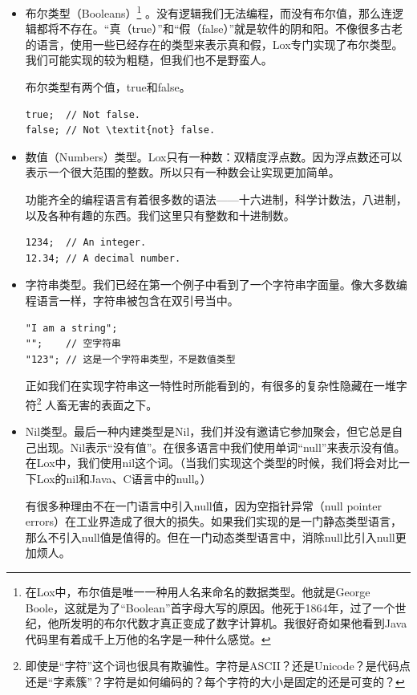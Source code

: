 \documentclass[cn,10pt,math=newtx,citestyle=gb7714-2015,bibstyle=gb7714-2015]{elegantbook}
\begin{document}
\begin{itemize}
\item 布尔类型（Booleans）\footnote{在Lox中，布尔值是唯一一种用人名来命名的数据类型。他就是George Boole，这就是为了“Boolean”首字母大写的原因。他死于1864年，过了一个世纪，他所发明的布尔代数才真正变成了数字计算机。我很好奇如果他看到Java代码里有着成千上万他的名字是一种什么感觉。} 。没有逻辑我们无法编程，而没有布尔值，那么连逻辑都将不存在。“真（true）”和“假（false）”就是软件的阴和阳。不像很多古老的语言，使用一些已经存在的类型来表示真和假，Lox专门实现了布尔类型。我们可能实现的较为粗糙，但我们也不是野蛮人。

布尔类型有两个值，true和false。

\begin{verbatim}
true;  // Not false.
false; // Not \textit{not} false.
\end{verbatim}

\item 数值（Numbers）类型。Lox只有一种数：双精度浮点数。因为浮点数还可以表示一个很大范围的整数。所以只有一种数会让实现更加简单。

功能齐全的编程语言有着很多数的语法——十六进制，科学计数法，八进制，以及各种有趣的东西。我们这里只有整数和十进制数。

\begin{verbatim}
1234;  // An integer.
12.34; // A decimal number.
\end{verbatim}

\item 字符串类型。我们已经在第一个例子中看到了一个字符串字面量。像大多数编程语言一样，字符串被包含在双引号当中。

\begin{verbatim}
"I am a string";
"";    // 空字符串
"123"; // 这是一个字符串类型，不是数值类型
\end{verbatim}

正如我们在实现字符串这一特性时所能看到的，有很多的复杂性隐藏在一堆字符\footnote{即使是“字符”这个词也很具有欺骗性。字符是ASCII？还是Unicode？是代码点还是“字素簇”？字符是如何编码的？每个字符的大小是固定的还是可变的？} 人畜无害的表面之下。

\item Nil类型。最后一种内建类型是Nil，我们并没有邀请它参加聚会，但它总是自己出现。Nil表示“没有值”。在很多语言中我们使用单词“null”来表示没有值。在Lox中，我们使用nil这个词。（当我们实现这个类型的时候，我们将会对比一下Lox的nil和Java、C语言中的null。）

有很多种理由不在一门语言中引入null值，因为空指针异常（null pointer errors）在工业界造成了很大的损失。如果我们实现的是一门静态类型语言，那么不引入null值是值得的。但在一门动态类型语言中，消除null比引入null更加烦人。
\end{itemize}
\end{document}
